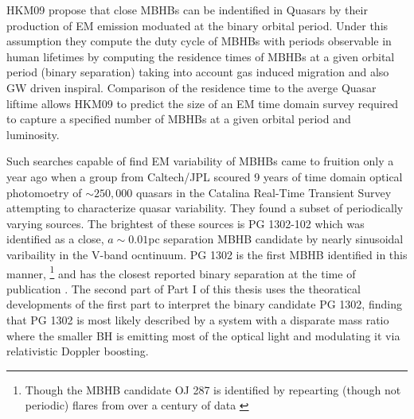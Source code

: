 HKM09 propose that close MBHBs can be indentified in Quasars by their production of EM emission moduated at the binary orbital period. Under this assumption they compute the duty cycle of MBHBs with periods observable in human lifetimes by computing the residence times of MBHBs at a given orbital period (binary separation) taking into account gas induced migration and also GW driven inspiral. Comparison of the residence time to the averge Quasar liftime allows HKM09 to predict the size of an EM time domain survey required to capture a specified number of MBHBs at a given orbital period and luminosity.






Such searches capable of find EM variability of MBHBs came to fruition only a
year ago when a group from Caltech/JPL scoured 9 years of time domain optical
photomoetry of $\sim250,000$ quasars in the Catalina Real-Time Transient
Survey \citep[CRTS][]{CRTS1:Drake:2009, CRTS2:Djorgovski:2010, CRTS3:2011Mahabal,
CRTS4:Djorgovski:2011} attempting to characterize quasar variability. They
found a subset of periodically varying sources. The brightest of these sources
is PG 1302-102 which was identified as a close, $a \sim 0.01$pc separation
MBHB candidate by nearly sinusoidal varibaility in the V-band ocntinuum. PG
1302 is the first MBHB identified in this manner, \footnote{Though the MBHB candidate OJ 287 is identified by repearting (though not periodic) flares from over a century of data \citep{OJ287}} and has the closest reported
binary separation at the time of publication \citep{Graham+2015a}. The second
part of Part I of this thesis uses the theoratical developments of the first
part to interpret the binary candidate PG 1302, finding that PG 1302 is most
likely described by a system with a disparate mass ratio where the smaller BH
is emitting most of the optical light and modulating it via relativistic
Doppler boosting.


